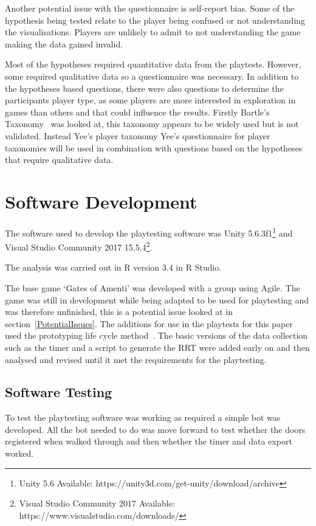 \documentclass[journal]{IEEEtran}
\begin{document}
	Another potential issue with the questionnaire is self-report bias. Some of the hypothesis being tested relate to the player being confused or not understanding the visualisations. Players are unlikely to admit to not understanding the game making the data gained invalid. 
	
	Most of the hypotheses required quantitative data from the playtests. However, some required qualitative data so a questionnaire was necessary.  In addition to the hypotheses based questions, there were also questions to determine the participants player type, as some players are more interested in exploration in games than others and that could influence the results. 
	Firstly Bartle's Taxonomy~\cite{Bartle1996} was looked at, this taxonomy appears to be widely used but is not validated. Instead Yee's player taxonomy 
	Yee's questionnaire for player taxonomies will be used in combination with questions based on the hypotheses that require qualitative data. 
	
	\section{Software Development} \label{softdev}
	The software used to develop the playtesting software was Unity 5.6.3f1\footnote[3]{Unity 5.6 Available: https://unity3d.com/get-unity/download/archive} and Visual Studio Community 2017  15.5.4\footnote[4]{Visual Studio Community 2017 Available: https://www.visualstudio.com/downloads/}.
	
	The analysis was carried out in R version 3.4 in R Studio.
	
	The base game `Gates of Amenti' was developed with a group using Agile. The game was still in development while being adapted to be used for playtesting and was therefore unfinished, this is a potential issue looked at in section~\ref{PotentialIssues}. The additions for use in the playtests for this paper used the prototyping life cycle method~\cite{isaias2015}. The basic versions of the data collection such as the timer and a script to generate the RRT were added early on and then analysed and revised until it met the requirements for the playtesting. 
	
	\subsection{Software Testing} \label{softtest}
	To test the playtesting software was working as required a simple bot was developed. All the bot needed to do was move forward to test whether the doors registered when walked through and then whether the timer and data export worked.
	
\end{document}
